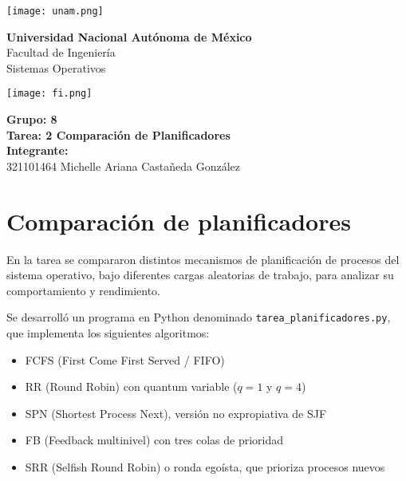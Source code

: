 \documentclass[12pt]{article}
\begin{document}
\begin{minipage}{0.25\textwidth}
    \texttt{[image: unam.png]}
\end{minipage}
\begin{minipage}{0.5\textwidth}
    \begin{center}
        \Large \textbf{Universidad Nacional Autónoma de México} \\[0.3cm]
        \normalsize Facultad de Ingeniería \\
        Sistemas Operativos
    \end{center}
\end{minipage}
\begin{minipage}{0.25\textwidth}
    \raggedleft
    \texttt{[image: fi.png]}
\end{minipage}

\vspace{1.5cm}

\begin{center}
    \textbf{Grupo: 8} \\[0.3cm]
    \textbf{Tarea: 2 Comparación de Planificadores} \\[1cm]
    \textbf{Integrante:} \\[0.3cm]
    321101464 Michelle Ariana Castañeda González
\end{center}

\vspace{1.5cm}

\section*{Comparación de planificadores}

En la tarea se compararon distintos mecanismos de planificación de procesos del sistema operativo, bajo diferentes cargas aleatorias de trabajo, para analizar su comportamiento y rendimiento. 

Se desarrolló un programa en Python denominado \texttt{tarea\_planificadores.py}, que implementa los siguientes algoritmos:

\begin{itemize}
    \item FCFS (First Come First Served / FIFO)
    \item RR (Round Robin) con quantum variable (\(q=1\) y \(q=4\))
    \item SPN (Shortest Process Next), versión no expropiativa de SJF
    \item FB (Feedback multinivel) con tres colas de prioridad
    \item SRR (Selfish Round Robin) o ronda egoísta, que prioriza procesos nuevos
\end{itemize}
\end{document}
